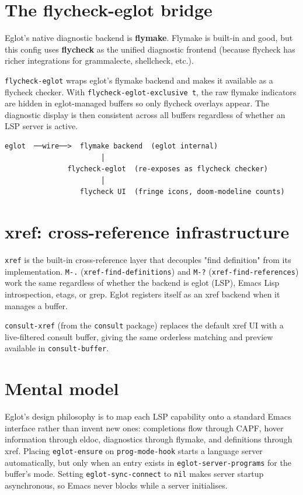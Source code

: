\section{The flycheck-eglot bridge}\label{the-flycheck-eglot-bridge}

Eglot's native diagnostic backend is \textbf{flymake}. Flymake is built-in and good, but this config uses \textbf{flycheck} as the unified diagnostic frontend (because flycheck has richer integrations for grammalecte, shellcheck, etc.).

\texttt{flycheck-eglot} wraps eglot's flymake backend and makes it available as a flycheck checker. With \texttt{flycheck-eglot-exclusive t}, the raw flymake indicators are hidden in eglot-managed buffers so only flycheck overlays appear. The diagnostic display is then consistent across all buffers regardless of whether an LSP server is active.

\begin{verbatim}
eglot  ──wire──>  flymake backend  (eglot internal)
                       │
               flycheck-eglot  (re-exposes as flycheck checker)
                       │
                  flycheck UI  (fringe icons, doom-modeline counts)
\end{verbatim}

\section{xref: cross-reference infrastructure}\label{xref-cross-reference-infrastructure}

\texttt{xref} is the built-in cross-reference layer that decouples "find definition" from its implementation. \texttt{M-.} (\texttt{xref-find-definitions}) and \texttt{M-?} (\texttt{xref-find-references}) work the same regardless of whether the backend is eglot (LSP), Emacs Lisp introspection, etags, or grep. Eglot registers itself as an xref backend when it manages a buffer.

\texttt{consult-xref} (from the \texttt{consult} package) replaces the default xref UI with a live-filtered consult buffer, giving the same orderless matching and preview available in \texttt{consult-buffer}.

\section{Mental model}
Eglot's design philosophy is to map each LSP capability onto a standard Emacs interface rather than invent new ones: completions flow through CAPF, hover information through eldoc, diagnostics through flymake, and definitions through xref.  Placing \texttt{eglot-ensure} on \texttt{prog-mode-hook} starts a language server automatically, but only when an entry exists in \texttt{eglot-server-programs} for the buffer's mode.  Setting \texttt{eglot-sync-connect} to \texttt{nil} makes server startup asynchronous, so Emacs never blocks while a server initialises.

